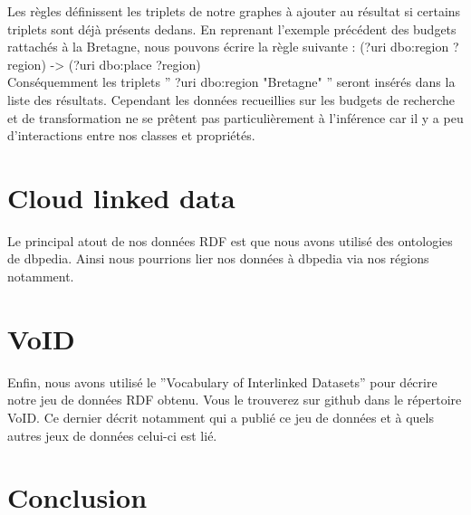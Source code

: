 \documentclass[a4paper,sffamily,12pt]{article}
\begin{document}
		\indent Les règles définissent les triplets de notre graphes à ajouter au résultat si certains triplets sont déjà présents dedans. En reprenant l'exemple précédent des budgets rattachés à la Bretagne, nous pouvons écrire la règle suivante : (?uri dbo:region ?region) -> (?uri dbo:place ?region) \\ 
		
		\indent Conséquemment les triplets '' ?uri dbo:region "Bretagne" '' seront insérés dans la liste des résultats. Cependant les données recueillies sur les budgets de recherche et de transformation ne se prêtent pas particulièrement à l'inférence car il y a peu d'interactions entre nos classes et propriétés.

		\vspace{0.5cm}
		
	\section{Cloud linked data}

		\vspace{0.5cm}

		Le principal atout de nos données RDF est que nous avons utilisé des ontologies de dbpedia. Ainsi nous pourrions lier nos données à dbpedia via nos régions notamment.	

		\vspace{0.5cm}
		
	\section{VoID}

		\vspace{0.5cm}

		Enfin, nous avons utilisé le ''Vocabulary of Interlinked Datasets'' pour décrire notre jeu de données RDF obtenu. Vous le trouverez sur github dans le répertoire VoID. Ce dernier décrit notamment qui a publié ce jeu de données et à quels autres jeux de données celui-ci est lié.

		\vspace{0.5cm}
								
	\section{Conclusion}

		\vspace{0.5cm}			
\end{document}
